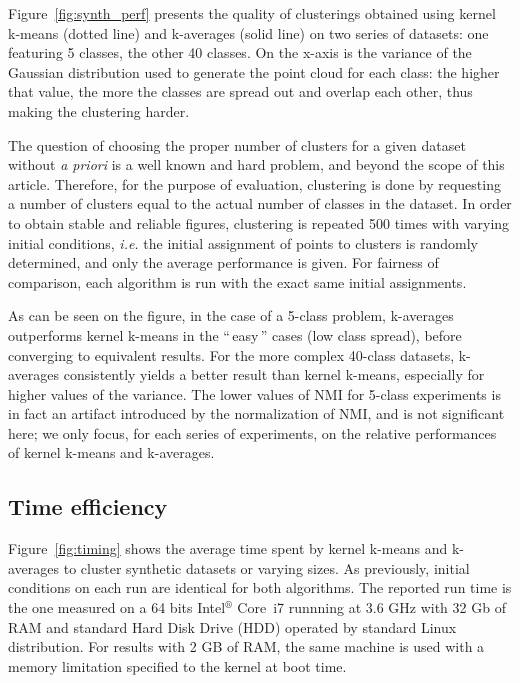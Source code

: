 \documentclass[natbib,smallextended]{svjour3}
\newcommand{\gl}[1]{``\,#1\,''} %
\begin{document}
Figure~\ref{fig:synth_perf} presents the quality of clusterings obtained using kernel k-means (dotted line) and k-averages (solid line) on two series of datasets: one featuring 5 classes, the other 40 classes. On the x-axis is the variance of the Gaussian distribution used to generate the point cloud for each class: the higher that value, the more the classes are spread out and overlap each other, thus making the clustering harder.

The question of choosing the proper number of clusters for a given dataset without \textit{a priori} is a well known and hard problem, and beyond the scope of this article. Therefore, for the purpose of evaluation, clustering is done by requesting a number of clusters equal to the actual number of classes in the dataset. In order to obtain stable and reliable figures, clustering is repeated 500 times with varying initial conditions, \textit{i.e.} the initial assignment of points to clusters is randomly determined, and only the average performance is given. For fairness of comparison, each algorithm is run with the exact same initial assignments.

As can be seen on the figure, in the case of a 5-class problem, k-averages outperforms kernel k-means in the \gl{easy} cases (low class spread), before converging to equivalent results. For the more complex 40-class datasets, k-averages consistently yields a better result than kernel k-means, especially for higher values of the variance. The lower values of NMI for 5-class experiments is in fact an artifact introduced by the normalization of NMI, and is not significant here; we only focus, for each series of experiments, on the relative performances of kernel k-means and k-averages.

\subsection{Time efficiency}

Figure~\ref{fig:timing} shows the average time spent by kernel k-means and k-averages to cluster synthetic datasets or varying sizes. As previously, initial conditions on each run are identical for both algorithms. The reported run time is the one measured on a 64 bits Intel$^\circledR$ Core\texttrademark   \, i7 runnning at 3.6 GHz with 32 Gb of RAM and standard Hard Disk Drive (HDD)  operated by standard Linux distribution. For results with 2 GB of RAM, the same machine is used with a memory limitation specified to the kernel at boot time.
\end{document}
